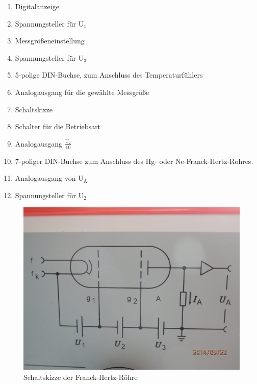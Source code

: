 \documentclass[12pt,a4paper]{article}
\begin{document}
\begin{enumerate}
\item	Digitalanzeige 

\item	Spannungsteller für U$_1$

\item	Messgrößeneinstellung

\item	Spannungsteller für U$_3$

\item	5-polige DIN-Buchse, zum Anschluss des Temperaturfühlers

\item	Analogausgang für die gewählte Messgröße

\item	Schaltskizze 

\item	Schalter für die Betriebsart

\item	Analogausgang $\frac{\text{U}_2}{10}$ 

\item	7-poliger DIN-Buchse zum Anschluss des Hg- oder Ne-Franck-Hertz-Rohres.

\item	Analogausgang von U$_\text{A}$

\item	Spannungsteller für U$_2$
\end{enumerate}

\begin{figure}[H] 
  \centering
    \includegraphics[scale = 0.3]{skizze_rohr.JPG}
  	\caption[Schaltskizze der Franck-Hertz-Röhre]{Schaltskizze der Franck-Hertz-Röhre}
  \label{fig:abb_versuch_3}
\end{figure}
\end{document}
